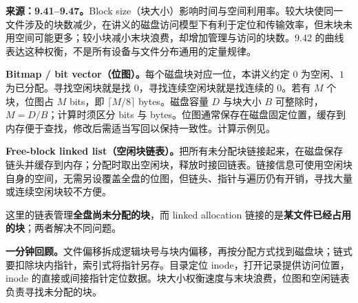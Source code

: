 \textbf{来源：9.41--9.47。}Block size（块大小）影响时间与空间利用率。较大块使同一文件涉及的块数减少，在讲义的磁盘访问模型下有利于定位和传输效率，但末块未用空间可能更多；较小块减小末块浪费，却增加管理与访问的块数。9.42 的曲线表达这种权衡，不是所有设备与文件分布通用的定量规律。

\textbf{Bitmap / bit vector（位图）。}每个磁盘块对应一位，本讲义约定 $0$ 为空闲、$1$ 为已分配。寻找空闲块就是找 $0$，寻找连续空闲块就是找连续的 $0$。若有 $M$ 个块，位图占 $M$ bits，即 $\lceil M/8\rceil$ bytes。磁盘容量 $D$ 与块大小 $B$ 可整除时，$M=D/B$；计算时须区分 bits 与 bytes。位图通常保存在磁盘固定位置，缓存到内存便于查找，修改后需适当写回以保持一致性。计算示例见。

\textbf{Free-block linked list（空闲块链表）。}把所有未分配块链接起来，在磁盘保存链头并缓存到内存；分配时取出空闲块，释放时接回链表。链接信息可使用空闲块自身的空间，无需另设覆盖全盘的位图，但链头、指针与遍历仍有开销，寻找大量或连续空闲块较不方便。

这里的链表管理\textbf{全盘尚未分配的块}，而 linked allocation 链接的是\textbf{某文件已经占用的块}；两者解决不同问题。

\textbf{一分钟回顾。}文件偏移拆成逻辑块号与块内偏移，再按分配方式找到磁盘块；链式要扣除块内指针，索引式将指针另存。目录定位 inode，打开记录提供访问位置，inode 的直接或间接指针定位数据。块大小权衡速度与末块浪费，位图和空闲链表负责寻找未分配的块。
\endgroup
